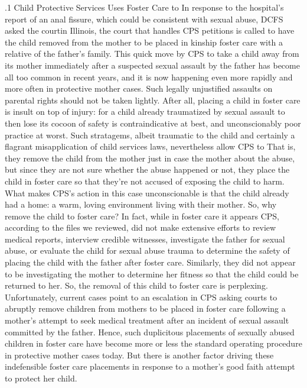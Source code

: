 \documentclass[11pt, twoside]{article}
\begin{document}
{\p.1{%
Child Protective Services Uses Foster Care to 
In response to the hospital's report of an anal fissure, which could be
consistent with sexual abuse, DCFS asked the court\mdash{}in Illinois, the
court that handles CPS petitions is called \mdash{}to have the
child removed from the mother to be placed in kinship foster care with
a relative of the father's family. This quick move by CPS to take a child
away from its mother immediately after a suspected sexual assault by the
father has become all too common in recent years, and it is now happening even more rapidly and more often in protective mother cases. Such
legally unjustified assaults on parental rights should not be taken lightly.
After all, placing a child in foster care is insult on top of injury: for a child
already traumatized by sexual assault to then lose its cocoon of safety is
contraindicative at best, and unconscionably poor practice at worst.
Such stratagems, albeit traumatic to the child and certainly a flagrant
misapplication of child services laws, nevertheless allow CPS to  That is, they remove the child from the mother just in case
the mother  about the abuse, but since they are not sure whether
the abuse happened or not, they place the child in foster care so that
they're not accused of exposing the child to harm. What makes CPS's
action in this case unconscionable is that the child already had a home:
a warm, loving environment living with their mother. So, why remove
the child to foster care? In fact, while in foster care it appears CPS, according to the files we reviewed, did not make extensive efforts to review
medical reports, interview credible witnesses, investigate the father for
sexual abuse, or evaluate the child for sexual abuse trauma to determine
the safety of placing the child with the father after foster care. Similarly, they did not appear to be investigating the mother to determine
her fitness so that the child could be returned to her. So, the removal
of this child to foster care is perplexing. Unfortunately, current cases
point to an escalation in CPS asking courts to abruptly remove children
from mothers to be placed in foster care following a mother's attempt
to seek medical treatment after an incident of sexual assault committed
by the father. Hence, such duplicitous placements of sexually abused
children in foster care have become more or less the standard operating
procedure in protective mother cases today. But
there is another factor driving these indefensible
foster care placements in response to a mother's good faith attempt to protect her child.
}%

}
\end{document}
